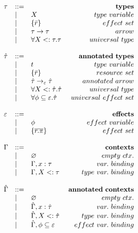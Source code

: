 \documentclass{llncs}
\newcommand{\poly}[2]{
	\forall #1. #2
}
\begin{document}
\[\begin{array}{lll}
& ~~~~~~~~&

\begin{array}{lllr}

\tau & ::= & ~ & \bf{types} \\
	& | & X & type~variable \\
	& | & \{ \bar r \} & effect~set \\
	& | & \tau \rightarrow \tau & arrow \\
	& | & \forall X <: \tau . \tau & universal~type \\
	&&\\

\hat \tau & ::= & ~ & \bf{annotated ~types} \\
		& | & t & type~variable \\
		& | & \{ \bar r \} & resource~set \\
		& | & \hat \tau \rightarrow_{\varepsilon} \hat \tau & annotated~arrow\\
		& | & \poly{X <: \hat \tau}{\hat \tau} & universal~type \\
		& | & \poly{\phi \subseteq \varepsilon}{\hat \tau} & universal~effect~set \\
		&&\\

\varepsilon & ::= & ~ &\bf{effects} \\
	& | & \phi & effect~variable \\
	& | & \{ \overline{r.\pi} \} & effect~set \\
	&&\\

\Gamma & ::= & ~ & \bf{contexts} \\
				& | & \varnothing & empty~ctx. \\
				& | & \Gamma, x: \tau & var.~binding \\
				& | & \Gamma, X <: \tau & type~var.~binding \\
				&&\\
				
\hat \Gamma & ::= & ~ & \bf{annotated~contexts}\\
				& | & \varnothing & empty~ctx. \\
				& | & \hat \Gamma, x: \hat \tau & var.~binding \\
				& | & \hat \Gamma, X <: \hat \tau & type~var.~binding \\
				& | & \hat \Gamma, \phi \subseteq \varepsilon & effect~var.~binding \\
				&&\\

\end{array}

\end{array}
\]
\end{document}
